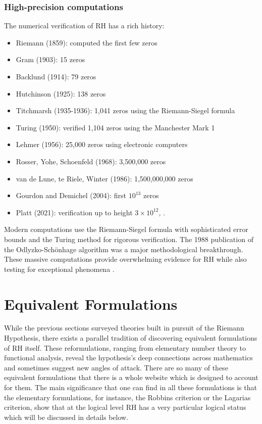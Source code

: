 \documentclass{article}
\begin{document}
\subsubsection{High-precision computations} The numerical verification of RH has a rich history:
    \begin{itemize}
        \item Riemann (1859): computed the first few zeros
        \item Gram (1903): 15 zeros
        \item Backlund (1914): 79 zeros
        \item Hutchinson (1925): 138 zeros
        \item Titchmarsh (1935-1936): 1,041 zeros using the Riemann-Siegel formula
        \item Turing (1950):  verified 1,104 zeros using the Manchester Mark 1
        \item Lehmer (1956): 25,000 zeros using electronic computers
        \item Rosser, Yohe, Schoenfeld (1968): 3,500,000 zeros
        \item van de Lune, te Riele, Winter (1986): 1,500,000,000 zeros
        \item Gourdon and Demichel (2004): first $10^{13}$ zeros
        \item Platt (2021): verification up to height $3 × 10^{12}$, \cite{Platt}.
    \end{itemize}
    Modern computations use the Riemann-Siegel formula with sophisticated error bounds and the Turing method for rigorous verification. The 1988 publication of the Odlyzko-Schönhage algorithm was a major methodological breakthrough. These massive computations provide overwhelming evidence for RH while also testing for exceptional phenomena \cite{Edwards,IvicBook}.

   




\section{Equivalent Formulations}

While the previous sections surveyed theories built in pursuit of the Riemann Hypothesis, there exists a parallel tradition of discovering equivalent formulations of RH itself. These reformulations, ranging from elementary number theory to functional analysis, reveal the hypothesis's deep connections across mathematics and sometimes suggest new angles of attack.  There are so many of these equivalent formulations that there is a whole website which is designed to account for them. The main significance that one can find in all these formulations is that the elementary formulations, for instance, the Robbins criterion or the Lagarias  criterion, show that at the logical level RH has a very particular logical  status which will be discussed in details below.
\end{document}
